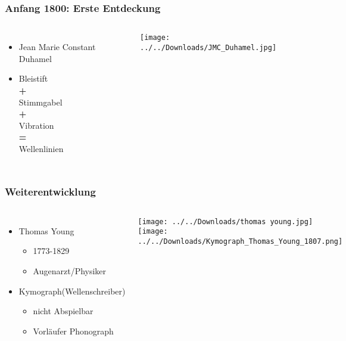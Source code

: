\documentclass{beamer}
\begin{document}
\begin{frame}
\frametitle{Anfang 1800: Erste Entdeckung}

\begin{columns}
	\begin{itemize}
	\Large
	\item Jean Marie Constant Duhamel
	\vspace{0.5cm}\item Bleistift\\ \hspace{0.7cm}\textbf{+}\\Stimmgabel\\ \hspace{0.7cm}\textbf{+}\\Vibration\\ \hspace{0.7cm}\textbf{=}\\Wellenlinien
	\end{itemize}
	\texttt{[image: ../../Downloads/JMC\_Duhamel.jpg]}
\end{columns}
\end{frame}
\begin{frame}
\frametitle{Weiterentwicklung}

\begin{columns}
	\begin{itemize}
	\Large
	\item Thomas Young
		\begin{itemize}
		\item 1773-1829
		 \item Augenarzt/Physiker
		\end{itemize}
		
		\vspace{0.5cm}\item Kymograph(Wellenschreiber)
		\begin{itemize}
		\item nicht Abspielbar
		\item Vorläufer Phonograph
		\end{itemize}					
	\end{itemize}
		\texttt{[image: ../../Downloads/thomas young.jpg]} 
		\texttt{[image: ../../Downloads/Kymograph\_Thomas\_Young\_1807.png]} 
\end{columns}	
\end{frame}
\end{document}
